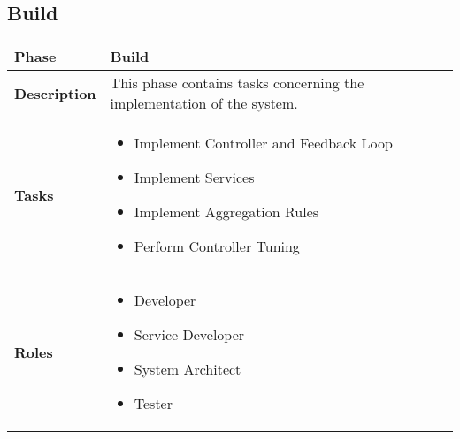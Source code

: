 \subsection{Build}
\begin{minipage}{\textwidth}
\label{table:ch6_View_Build}
\begin{tabular}
	{|m{2cm}|m{10cm}|} \hline \bfseries Phase & Build\\
	\hline \bfseries Description & This phase contains tasks concerning the implementation of the system.\\
	\hline \bfseries Tasks & 
	\begin{itemize}
		\item Implement Controller and Feedback Loop
		\item Implement Services
		\item Implement Aggregation Rules
		\item Perform Controller Tuning
	\end{itemize}
	\\
	\hline \bfseries Roles &
	\begin{itemize}
		\item Developer
		\item Service Developer
		\item System Architect
		\item Tester
	\end{itemize}
	\\
	\hline 
\end{tabular}
\end{minipage}

